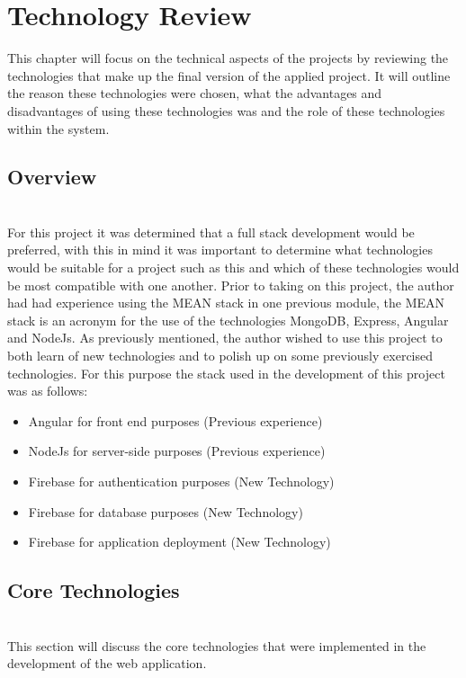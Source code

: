 \chapter{Technology Review}
This chapter will focus on the technical aspects of the projects by reviewing the technologies that make up the final version of the applied project. It will outline the reason these technologies were chosen, what the advantages and disadvantages of using these technologies was and the role of these technologies within the system.

\section{Overview} \\
For this project it was determined that a full stack development would be preferred, with this in mind it was important to determine what technologies would be suitable for a project such as this and which of these technologies would be most compatible with one another. Prior to taking on this project, the author had had experience using the MEAN stack in one previous module, the MEAN stack is an acronym for the use of the technologies MongoDB, Express, Angular and NodeJs. As previously mentioned, the author wished to use this project to both learn of new technologies and to polish up on some previously exercised technologies. For this purpose the stack used in the development of this project was as follows: \\
\begin{itemize}
    \item Angular for front end purposes (Previous experience)
    \item NodeJs for server-side purposes (Previous experience)
    \item Firebase for authentication purposes (New Technology)
    \item Firebase for database purposes (New Technology)
    \item Firebase for application deployment (New Technology)
\end{itemize}

\section{Core Technologies} \\
This section will discuss the core technologies that were implemented in the development of the web application. \\ \\

